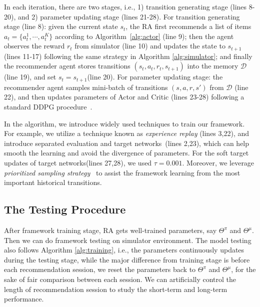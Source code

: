 In each iteration, there are two stages, i.e., 1) transition generating stage (lines 8-20), and 2) parameter updating stage (lines 21-28). For transition generating stage (line 8): given the current state $s_t$, the RA first recommends a list of items $a_t = \{a_t^1,  \cdots, a_t^K\}$ according to Algorithm~\ref{alg:actor} (line 9); then the agent observes the reward $r_t$ from simulator (line 10) and updates the state to $s_{t+1}$ (lines 11-17) following the same strategy in Algorithm \ref{alg:simulator}; and finally the recommender agent stores transitions $(s_t,a_t,r_t,s_{t+1})$ into the memory $\mathcal{D}$ (line 19), and set $s_{t} = s_{t+1}$(line 20). For parameter updating stage: the recommender agent samples mini-batch of transitions $(s, a, r, s')$ from $\mathcal{D}$ (line 22), and then updates parameters of Actor and Critic (lines 23-28) following a standard DDPG procedure~\cite{lillicrap2015continuous}.



In the algorithm, we introduce widely used techniques to train our framework. For example, we utilize a technique known as {\it experience replay} \cite{lin1993reinforcement} (lines 3,22), and introduce separated evaluation and target networks~\cite{mnih2013playing}(lines 2,23), which can help smooth the learning and avoid the divergence of parameters. For the soft target updates of target networks(lines 27,28), we used $\tau = 0.001$. Moreover, we leverage {\it prioritized sampling strategy}~\cite{moore1993prioritized} to assist the framework learning from the most important historical transitions. 



\subsection{The Testing Procedure}

\label{sec:testing}

After framework training stage, RA gets well-trained parameters, say $\Theta^{\pi}$ and $\Theta^{\mu}$. Then we can do framework testing on simulator environment. The model testing also follows Algorithm \ref{alg:training}, i.e., the parameters continuously updates during the testing stage, while the major difference from training stage is before each recommendation session, we reset the parameters back to $\Theta^{\pi}$ and $\Theta^{\mu}$, for the sake of fair comparison between each session. We can artificially control the length of recommendation session to study the short-term and long-term performance.